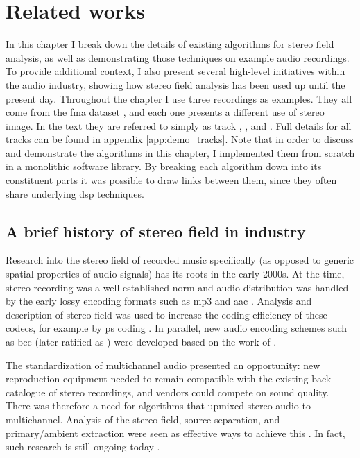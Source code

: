 \chapter{Related works}
\label{sec:related_works}

In this chapter I break down the details of existing algorithms for stereo field analysis, as well as demonstrating those techniques on example audio recordings. To provide additional context, I also present several high-level initiatives within the audio industry, showing how stereo field analysis has been used up until the present day. Throughout the chapter I use three recordings as examples. They all come from the \gls{fma} dataset \cite{defferrardFMADatasetMusic2017}, and each one presents a different use of stereo image. In the text they are referred to simply as track , , and . Full details for all tracks can be found in appendix \ref{app:demo_tracks}. Note that in order to discuss and demonstrate the algorithms in this chapter, I implemented them from scratch in a monolithic software library. By breaking each algorithm down into its constituent parts it was possible to draw links between them, since they often share underlying \gls{dsp} techniques.

\section{A brief history of stereo field in industry}
\label{sec:history}
Research into the stereo field of recorded music specifically (as opposed to generic spatial properties of audio signals) has its roots in the early 2000s. At the time, stereo recording was a well-established norm and audio distribution was handled by the early lossy encoding formats such as \gls{mp3} and \gls{aac} \cite{iso-11172-3:mpeg_audio,ISOIEC13818-7:2006-AAC}. Analysis and description of stereo field was used to increase the coding efficiency of these codecs, for example by \gls{ps} coding \cite{fallerParametricCodingSpatial2004,breebaartHighqualityParametricSpatial2004,breebaartParametricCodingStereo2005}. In parallel, new audio encoding schemes such as \gls{bcc} (later ratified as  \cite{iso/iec23003-1InformationTechnologyMPEG2007}) were developed based on the work of . 

The standardization of multichannel audio presented an opportunity: new reproduction equipment needed to remain compatible with the existing back-catalogue of stereo recordings, and vendors could compete on sound quality. There was therefore a need for algorithms that upmixed stereo audio to multichannel. Analysis of the stereo field, source separation, and primary/ambient extraction were seen as effective ways to achieve this \cite{goodwinPrimaryAmbientSignalDecomposition2007}. In fact, such research is still ongoing today \cite{shiFastNonuniformSearching2022}.

